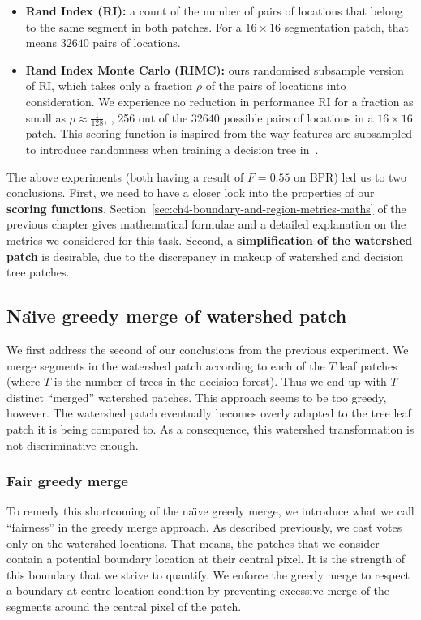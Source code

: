 \begin{itemize}
 \item{\bf Rand Index (RI):} a count of the number of pairs of locations that belong to the same segment in both patches. For a $16\times16$ segmentation patch, that means $32 640$ pairs of locations.
 \item{\bf Rand Index Monte Carlo (RIMC):} ours randomised subsample version of RI, which takes only a fraction $\rho$ of the pairs of locations into consideration. We experience no reduction in performance \wrt RI for a fraction as small as $\rho\approx\frac{1}{128}$, \ie, 256 out of the $32 640$ possible pairs of locations in a $16 \times 16$ patch. This scoring function is inspired from the way features are subsampled to introduce randomness when training a decision tree in~\cite{DollarICCV13edges,Dollar2013toolbox}.
\end{itemize}

The above experiments (both having a result of $F=0.55$ on BPR) led us to two conclusions. First, we need to have a closer look into the properties of our \textbf{scoring functions}. Section~\ref{sec:ch4-boundary-and-region-metrics-maths} of the previous chapter gives mathematical formulae and a detailed explanation on the metrics we considered for this task. Second, a \textbf{simplification of the watershed patch} is desirable, due to the discrepancy %
in makeup %
of watershed and decision tree patches.

\subsection{Na\"{\i}ve greedy merge of watershed patch}
We first address the second of our conclusions from the previous experiment. We merge segments in the watershed patch according to each of the $T$ leaf patches (where $T$ is the number of trees in the decision forest). Thus we end up with $T$ distinct ``merged'' watershed patches. This approach seems to be too greedy, however. The watershed patch eventually becomes overly adapted to the tree leaf patch it is being compared to. As a consequence, this watershed transformation is not discriminative enough.

\subsubsection{Fair greedy merge}
To remedy this shortcoming of the na\"{\i}ve greedy merge, we introduce what we call ``fairness'' in the greedy merge approach. As described previously, we cast votes only on the watershed locations. That means, the patches that we consider contain a potential boundary location at their central pixel. It is the strength of this boundary that we strive to quantify. We enforce the greedy merge to respect a boundary-at-centre-location condition by preventing excessive merge of the segments around the central pixel of the patch.

